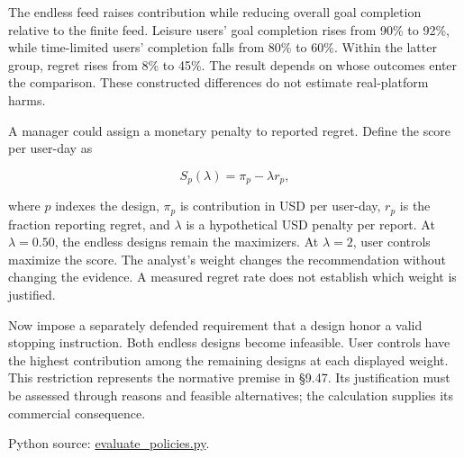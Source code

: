 The endless feed raises contribution while reducing overall goal
completion relative to the finite feed. Leisure users' goal completion
rises from 90\% to 92\%, while time-limited users' completion falls from
80\% to 60\%. Within the latter group, regret rises from 8\% to 45\%.
The result depends on whose outcomes enter the comparison. These
constructed differences do not estimate real-platform harms.

A manager could assign a monetary penalty to reported regret. Define the
score per user-day as

\[
S_p(\lambda)=\pi_p-\lambda r_p,
\]

where \(p\) indexes the design, \(\pi_p\) is contribution in USD per
user-day, \(r_p\) is the fraction reporting regret, and \(\lambda\) is a
hypothetical USD penalty per report. At \(\lambda=0.50\), the endless
designs remain the maximizers. At \(\lambda=2\), user controls maximize
the score. The analyst's weight changes the recommendation without
changing the evidence. A measured regret rate does not establish which
weight is justified.

Now impose a separately defended requirement that a design honor a valid
stopping instruction. Both endless designs become infeasible. User
controls have the highest contribution among the remaining designs at
each displayed weight. This restriction represents the normative premise
in §9.47. Its justification must be assessed through reasons and
feasible alternatives; the calculation supplies its commercial
consequence.

\FloatBarrier
{}
Python source:
\href{../03_Data_and_Code/Conflicts_of_Interest/evaluate_policies.py}{evaluate\_policies.py}.

